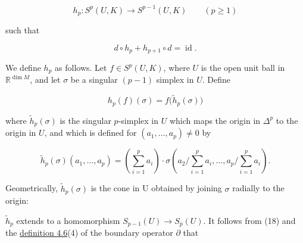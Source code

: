 \begin{equation}
\tag{15}\label{eq:5.31:15}
h_{p}\colon S^{p}(U,K)\to S^{p-1}(U,K)\qquad(p\geq1)
\end{equation}

such that

\begin{equation}
\tag{16}\label{eq:5.31:16}
d\circ h_{p}+h_{p+1}\circ d=\operatorname{id}.
\end{equation}

We define $h_p$ as follows. Let $f \in S^p(U,K)$, where $U$ is the open unit ball in $\mathbb{R}^{\dim M}$, and let $\sigma$ be a singular $(p-1)$ simplex in $U$. Define

\begin{equation}
\tag{17}\label{eq:5.31:17}
h_{p}(f)(\sigma)=f\big(\tilde{h}_{p}(\sigma)\big)
\end{equation}

where  $ \tilde{h}_{p}(\sigma) $ is the singular  $ p $-simplex in  $ U $ which maps the origin in  $ \Delta^{p} $ to the origin in  $ U $, and which is defined for  $ (a_{1}, \ldots, a_{p}) \neq 0 $ by

\begin{equation}
\tag{18}\label{eq:5.31:18}
\tilde{h}_{p}(\sigma)(a_{1},\ldots,a_{p})=\left(\sum_{i=1}^{p}a_{i}\right)\cdot\sigma\left(a_{2}\bigg/\sum_{i=1}^{p}a_{i},\ldots,a_{p}\bigg/\sum_{i=1}^{p}a_{i}\right).
\end{equation}

Geometrically,  $ \tilde{h}_{p}(\sigma) $ is the cone in U obtained by joining  $ \sigma $ radially to the origin:

\begin{center}
\end{center}

$ \tilde{h}_{p} $ extends to a homomorphism  $ S_{p-1}(U) \to S_{p}(U) $. It follows from (18) and the \hyperref[thm:4.6]{definition 4.6}(4) of the boundary operator  $ \partial $ that

